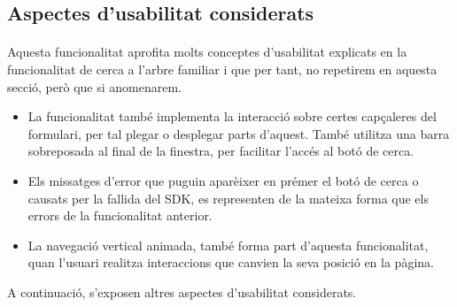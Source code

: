 \subsection{Aspectes d'usabilitat considerats}

    \paragraph{}
    Aquesta funcionalitat aprofita molts conceptes d'usabilitat explicats en la funcionalitat de cerca a l’arbre familiar i que per tant, no repetirem en aquesta secció, però que si anomenarem.

    \begin{itemize}
        \item La funcionalitat també implementa la interacció sobre certes capçaleres del formulari, per tal plegar o desplegar parts d'aquest. També utilitza una barra sobreposada al final de la finestra, per facilitar l'accés al botó de cerca.
        \item Els missatges d'error que puguin aparèixer en prémer el botó de cerca o causats per la fallida del SDK, es representen de la mateixa forma que els errors de la funcionalitat anterior.
        \item La navegació vertical animada, també forma part d'aquesta funcionalitat, quan l'usuari realitza interaccions que canvien la seva posició en la pàgina.
    \end{itemize}

    A continuació, s'exposen altres aspectes d'usabilitat considerats.

    
    
    
